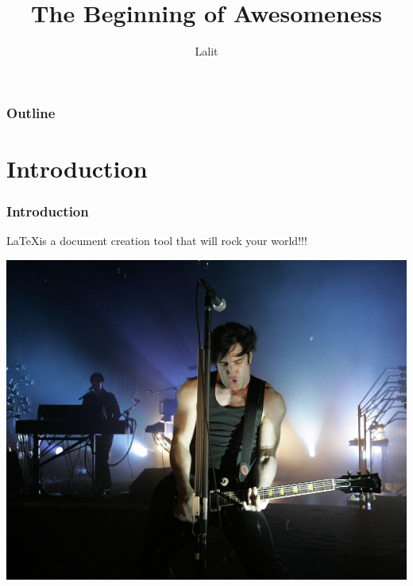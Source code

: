 \documentclass{beamer}
\title{The Beginning of Awesomeness}
\author{Lalit}
\institute{UW-Madison}
\begin{document}
\begin{frame}
  \titlepage
  
\end{frame}

\begin{frame}
\frametitle{Outline}
\tableofcontents[pausesections]
\end{frame}


\section{Introduction}
\begin{frame}
\frametitle{Introduction}
\LaTeX is a document creation tool that will rock your world!!!
\pause
\begin{center}
\includegraphics[scale=.25]{rock.jpg}
\end{center}
\end{frame}
\end{document}
